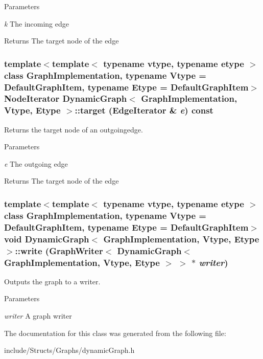 \begin{DoxyParams}{Parameters}
\item[{\em k}]The incoming edge \end{DoxyParams}
\begin{DoxyReturn}{Returns}
The target node of the edge 
\end{DoxyReturn}
\hypertarget{class_dynamic_graph_a44edd0e001007679e8ae257bb7341bed}{
\subsubsection[{target}]{\setlength{\rightskip}{0pt plus 5cm}template$<$template$<$ typename vtype, typename etype $>$ class GraphImplementation, typename Vtype  = DefaultGraphItem, typename Etype  = DefaultGraphItem$>$ NodeIterator {\bf DynamicGraph}$<$ GraphImplementation, Vtype, Etype $>$::target (EdgeIterator \& {\em e}) const}}
\label{class_dynamic_graph_a44edd0e001007679e8ae257bb7341bed}


Returns the target node of an outgoingedge. 


\begin{DoxyParams}{Parameters}
\item[{\em e}]The outgoing edge \end{DoxyParams}
\begin{DoxyReturn}{Returns}
The target node of the edge 
\end{DoxyReturn}
\hypertarget{class_dynamic_graph_a10d7f8456bc3a9247ea9f3cc1aae63b0}{
\subsubsection[{write}]{\setlength{\rightskip}{0pt plus 5cm}template$<$template$<$ typename vtype, typename etype $>$ class GraphImplementation, typename Vtype  = DefaultGraphItem, typename Etype  = DefaultGraphItem$>$ void {\bf DynamicGraph}$<$ GraphImplementation, Vtype, Etype $>$::write (GraphWriter$<$ {\bf DynamicGraph}$<$ GraphImplementation, Vtype, Etype $>$ $>$ $\ast$ {\em writer})}}
\label{class_dynamic_graph_a10d7f8456bc3a9247ea9f3cc1aae63b0}


Outputs the graph to a writer. 


\begin{DoxyParams}{Parameters}
\item[{\em writer}]A graph writer \end{DoxyParams}


The documentation for this class was generated from the following file:\begin{DoxyCompactItemize}
\item 
include/Structs/Graphs/dynamicGraph.h\end{DoxyCompactItemize}
